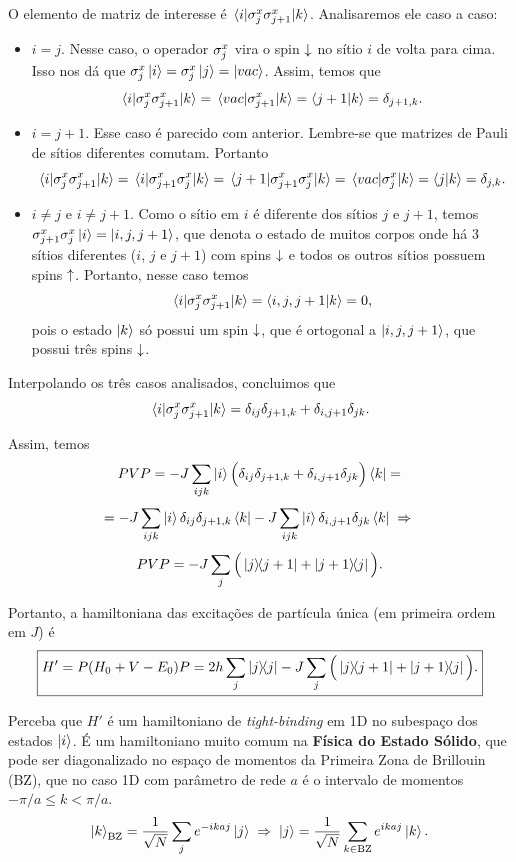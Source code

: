 \documentclass[a4paper,10pt]{article}
\newcommand{\vac}{\ket{vac}}
\begin{document}
O elemento de matriz de interesse é $\mel{i}{\sigma_j^x \sigma_{j+1}^x}{k}$. Analisaremos ele caso a caso:
\begin{itemize}
\item $i = j$. Nesse caso, o operador $\sigma_j^x$ vira o spin $\downarrow$ no sítio $i$ de volta para cima. Isso nos dá que $\s_j^x \ket{i} = \s_j^x \ket{j} = \vac$. Assim, temos que
$$
\mel{i}{\sigma_j^x \sigma_{j+1}^x}{k} = \mel{vac}{\sigma_{j+1}^x}{k} = \braket{j+1}{k} = \delta_{j+1,k}.
$$
\item $i = j+1$. Esse caso é parecido com anterior. Lembre-se que matrizes de Pauli de sítios diferentes comutam. Portanto
$$
\mel{i}{\sigma_j^x \sigma_{j+1}^x}{k} = \mel{i}{\sigma_{j+1}^x \sigma_j^x}{k} = \mel{j+1}{\sigma_{j+1}^x \sigma_j^x}{k}
= \mel{vac}{\sigma_{j}^x}{k} = \braket{j}{k} = \delta_{j,k}.
$$
\item $i \neq j$ e $i \neq j+1$. Como o sítio em $i$ é diferente dos sítios $j$ e $j+1$, temos $\sigma_{j+1}^x \sigma_j^x \ket{i} = \ket{i, j, j+1}$, que denota o estado de muitos corpos onde há 3 sítios diferentes ($i$, $j$ e $j+1$) com spins $\downarrow$ e todos os outros sítios possuem spins $\uparrow$. Portanto, nesse caso temos
$$
\mel{i}{\sigma_j^x \sigma_{j+1}^x}{k} = \braket{i,j,j+1}{k} = 0,
$$
pois o estado $\ket{k}$ só possui um spin $\downarrow$, que é ortogonal a $\ket{i,j,j+1}$, que possui três spins $\downarrow$.
\end{itemize}

Interpolando os três casos analisados, concluimos que
$$
\mel{i}{\sigma_j^x \sigma_{j+1}^x}{k} = \delta_{ij} \delta_{j+1, k} + \delta_{i,j+1} \delta_{jk}.
$$

Assim, temos
$$
PVP =
-J \sum_{ijk} \ket{i}
\Big(
\delta_{ij} \delta_{j+1, k} + \delta_{i,j+1} \delta_{jk}
\Big)
\bra{k} =
$$
$$
=
-J \sum_{ijk} \ket{i} \delta_{ij} \delta_{j+1, k} \bra{k}
-J \sum_{ijk} \ket{i} \delta_{i,j+1} \delta_{jk} \bra{k}
\; \Rightarrow \;
$$
$$
PVP =
-J \sum_{j} \Big(
\dyad{j}{j+1} + \dyad{j+1}{j}
\Big).
$$

\n

Portanto, a hamiltoniana das excitações de partícula única (em primeira ordem em $J$) é
$$
\boxed{
H' = P(H_0 + V - E_0)P =
2h \sum_{j} \dyad{j}
-J \sum_{j} \Big(
\dyad{j}{j+1} + \dyad{j+1}{j}
\Big).
}
$$

\n

Perceba que $H'$ é um hamiltoniano de \textit{tight-binding} em 1D no subespaço dos estados $\ket{i}$. É um hamiltoniano muito comum na \textbf{Física do Estado Sólido}, que pode ser diagonalizado no espaço de momentos da Primeira Zona de Brillouin (BZ), que no caso 1D com parâmetro de rede $a$ é o intervalo de momentos $-\pi/a \leq k < \pi/a$.
$$
\ket{k}_{\text{BZ}} =
\frac{1}{\sqrt{N}} \sum_{j} e^{-ika j} \ket{j} \; \Rightarrow \;
\ket{j} =
\frac{1}{\sqrt{N}} \sum_{k \in \text{BZ}} e^{ika j} \ket{k} .
$$
\end{document}
